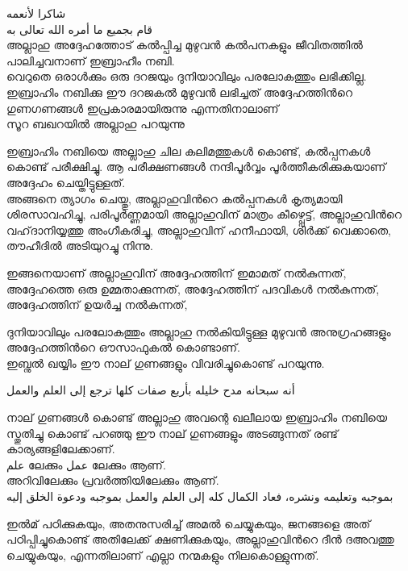   \textarabic{شاكرا لأنعمه} \\
  
  \textarabic{قام بجميع ما أمره الله تعالى به} \\
 അല്ലാഹു അദ്ദേഹത്തോട് കൽപ്പിച്ച മുഴുവൻ കൽപനകളും ജീവിതത്തിൽ പാലിച്ചവനാണ് ഇബ്രാഹീം നബി. \\
 
 വെറുതെ ഒരാൾക്കും ഒരു ദറജയും ദുനിയാവിലും പരലോകത്തും ലഭിക്കില്ല.  ഇബ്രാഹിം നബിക്കു ഈ ദറജകൽ മുഴുവൻ ലഭിച്ചത് 
 അദ്ദേഹത്തിൻറെ ഗുണഗണങ്ങൾ ഇപ്രകാരമായിരുന്നു എന്നതിനാലാണ് \\
 
 സൂറ ബഖറയിൽ അല്ലാഹു പറയുന്നു \\
    \textarabic{\quranayah[2][124]} 
    
    
    ഇബ്രാഹിം നബിയെ അല്ലാഹു ചില കലിമത്തുകൾ കൊണ്ട്, കൽപ്പനകൾ കൊണ്ട് പരീക്ഷിച്ചു.  ആ പരീക്ഷണങ്ങൾ നന്ദിപൂർവ്വം പൂർത്തീകരിക്കുകയാണ് 
    അദ്ദേഹം ചെയ്തിട്ടുള്ളത്. \\
    
    
അങ്ങനെ ത്യാഗം ചെയ്തു,  അല്ലാഹുവിൻറെ കൽപ്പനകൾ കൃത്യമായി ശിരസാവഹിച്ചു,  പരിപൂർണ്ണമായി അല്ലാഹുവിന് മാത്രം കീഴ്പ്പെട്ട്, അല്ലാഹുവിൻറെ വഹ്‌ദാനിയ്യത്തു അംഗീകരിച്ചു,  അല്ലാഹുവിന് ഹനീഫായി, ശിർക്ക് വെക്കാതെ, തൗഹീദിൽ അടിയുറച്ചു നിന്നു. 

ഇങ്ങനെയാണ് അല്ലാഹുവിന് 
അദ്ദേഹത്തിന് ഇമാമത് നൽകുന്നത്,
അദ്ദേഹത്തെ ഒരു ഉമ്മതാക്കുന്നത്,
അദ്ദേഹത്തിന് പദവികൾ നൽകുന്നത്,
അദ്ദേഹത്തിന് ഉയർച്ച നൽകുന്നത്, 

ദുനിയാവിലും പരലോകത്തും 
അല്ലാഹു നൽകിയിട്ടുള്ള മുഴുവൻ അനുഗ്രഹങ്ങളും അദ്ദേഹത്തിൻറെ ഔസാഫുകൽ  കൊണ്ടാണ്. \\


ഇബ്നുൽ ഖയ്യിം ഈ നാല് ഗുണങ്ങളും വിവരിച്ചുകൊണ്ട് പറയുന്നു. 

\textarabic{أنه سبحانه مدح خليله بأربع صفات كلها ترجع إلى العلم والعمل}


 നാല് ഗുണങ്ങൾ കൊണ്ട് അല്ലാഹു അവന്റെ ഖലീലായ ഇബ്രാഹിം നബിയെ സ്തുതിച്ചു കൊണ്ട് പറഞ്ഞു 
ഈ നാല് ഗുണങ്ങളും അടങ്ങുന്നത് രണ്ട് കാര്യങ്ങളിലേക്കാണ്. \\
\textarabic{علم} ലേക്കും \textarabic{عمل} ലേക്കും ആണ്. \\ അറിവിലേക്കും പ്രവർത്തിയിലേക്കും ആണ്. \\

\textarabic{بموجبه وتعليمه ونشره، فعاد الكمال كله إلى العلم والعمل بموجبه ودعوة الخلق إليه}
 
 

ഇൽമ് പഠിക്കുകയും, അതനുസരിച്ച് അമൽ ചെയ്യുകയും, ജനങ്ങളെ അത് പഠിപ്പിച്ചുകൊണ്ട് അതിലേക്ക് ക്ഷണിക്കുകയും, അല്ലാഹുവിൻറെ ദീൻ ദഅവത്തു ചെയ്യുകയും, എന്നതിലാണ്  എല്ലാ നന്മകളും നിലകൊള്ളുന്നത്. \\


